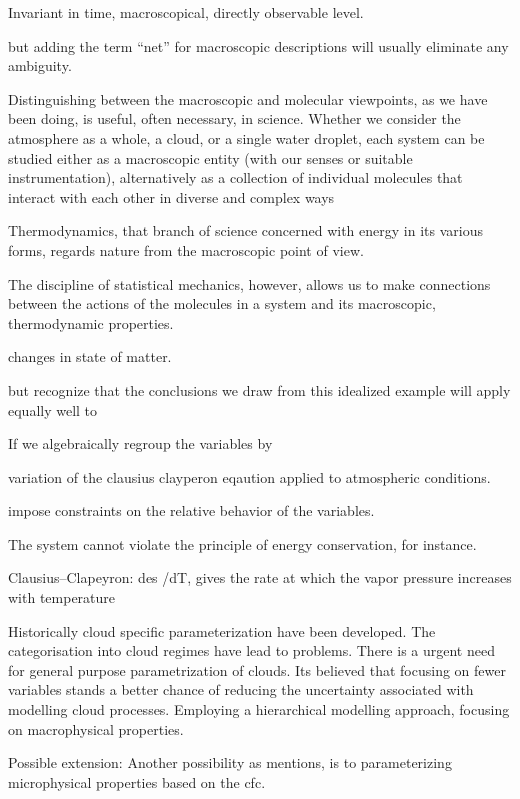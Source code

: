 



Invariant in time, 
macroscopical, directly observable level.

but adding the term “net” for macroscopic descriptions will usually
eliminate any ambiguity.

Distinguishing between the macroscopic and molecular viewpoints, as we have been
doing, is useful, often necessary, in science. Whether we consider the atmosphere as a
whole, a cloud, or a single water droplet, each system can be studied either as a macroscopic
entity (with our senses or suitable instrumentation), alternatively as a collection of
individual molecules that interact with each other in diverse and complex ways

Thermodynamics, that branch of science concerned with energy in its various forms,
regards nature from the macroscopic point of view.

The discipline of statistical mechanics, however, allows us to make connections
between the actions of the molecules in a system and its macroscopic, thermodynamic
properties.

changes in state of matter.

but recognize that the
conclusions we draw from this idealized example will apply equally well to


If we algebraically regroup the variables by

variation of the clausius clayperon eqaution applied to atmospheric conditions.

impose constraints on the relative behavior of the variables.

The system cannot violate the principle of energy conservation, for instance.

Clausius–Clapeyron: des /dT, gives the rate at which the vapor pressure increases with temperature

Historically cloud specific parameterization have been developed. The categorisation into cloud regimes have lead to problems. There is a urgent need for general purpose parametrization of clouds. Its believed that focusing on fewer variables stands a better chance of reducing the uncertainty associated with modelling cloud processes. Employing a hierarchical modelling approach, focusing on macrophysical properties.

Possible extension: Another possibility as \cite{Fowler1996LiquidAssumptions} mentions, is to parameterizing microphysical properties based on the \acrshort{cfc}.

